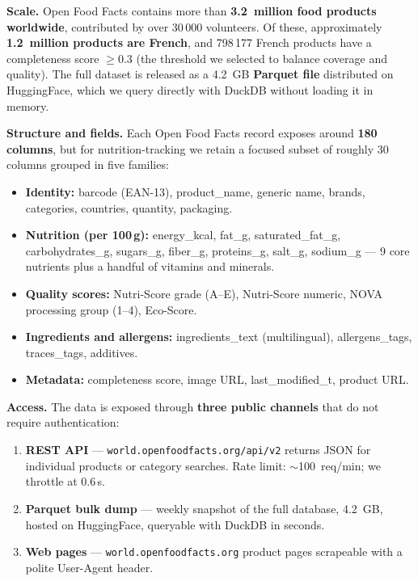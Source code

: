 \documentclass[a4paper,11pt,oneside,openany]{report}
\newcommand{\off}{Open Food Facts}
\begin{document}
\textbf{Scale.} \off{} contains more than \textbf{3.2~million food
products worldwide}, contributed by over 30\,000 volunteers. Of these,
approximately \textbf{1.2~million products are French}, and 798\,177
French products have a completeness score $\geq 0.3$ (the threshold
we selected to balance coverage and quality). The full dataset is
released as a 4.2~GB \textbf{Parquet file} distributed on HuggingFace,
which we query directly with DuckDB without loading it in memory.

\textbf{Structure and fields.} Each \off{} record exposes around
\textbf{180 columns}, but for nutrition-tracking we retain a focused
subset of roughly 30 columns grouped in five families:

\begin{itemize}[nosep]
  \item \textbf{Identity:} barcode (EAN-13), product\_name, generic
        name, brands, categories, countries, quantity, packaging.
  \item \textbf{Nutrition (per 100\,g):} energy\_kcal, fat\_g,
        saturated\_fat\_g, carbohydrates\_g, sugars\_g, fiber\_g,
        proteins\_g, salt\_g, sodium\_g --- 9 core nutrients plus
        a handful of vitamins and minerals.
  \item \textbf{Quality scores:} Nutri-Score grade (A--E),
        Nutri-Score numeric, NOVA processing group (1--4), Eco-Score.
  \item \textbf{Ingredients and allergens:} ingredients\_text
        (multilingual), allergens\_tags, traces\_tags, additives.
  \item \textbf{Metadata:} completeness score, image URL,
        last\_modified\_t, product URL.
\end{itemize}

\textbf{Access.} The data is exposed through \textbf{three public
channels} that do not require authentication:

\begin{enumerate}[nosep]
  \item \textbf{REST API} --- \texttt{world.openfoodfacts.org/api/v2}
        returns JSON for individual products or category searches.
        Rate limit: $\sim$100~req/min; we throttle at 0.6\,s.
  \item \textbf{Parquet bulk dump} --- weekly snapshot of the full
        database, 4.2~GB, hosted on HuggingFace, queryable with
        DuckDB in seconds.
  \item \textbf{Web pages} --- \texttt{world.openfoodfacts.org}
        product pages scrapeable with a polite User-Agent header.
\end{enumerate}
\end{document}
